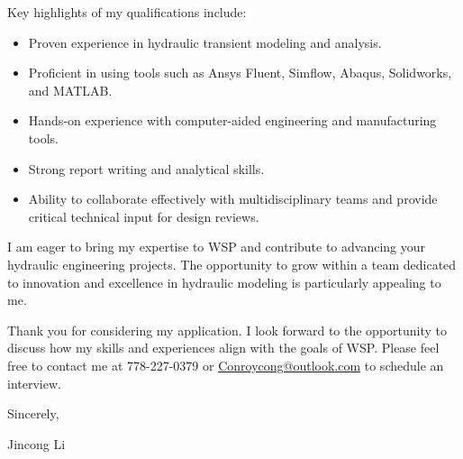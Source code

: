 \documentclass[letterpaper,11pt]{article}
\begin{document}
Key highlights of my qualifications include:

\begin{itemize}
    \item Proven experience in hydraulic transient modeling and analysis.
    \item Proficient in using tools such as Ansys Fluent, Simflow, Abaqus, Solidworks, and MATLAB.
    \item Hands-on experience with computer-aided engineering and manufacturing tools.
    \item Strong report writing and analytical skills.
    \item Ability to collaborate effectively with multidisciplinary teams and provide critical technical input for design reviews.
\end{itemize}

I am eager to bring my expertise to WSP and contribute to advancing your hydraulic engineering projects. The opportunity to grow within a team dedicated to innovation and excellence in hydraulic modeling is particularly appealing to me.

Thank you for considering my application. I look forward to the opportunity to discuss how my skills and experiences align with the goals of WSP. Please feel free to contact me at 778-227-0379 or \href{mailto:Conroycong@outlook.com}{Conroycong@outlook.com} to schedule an interview.

Sincerely,

Jincong Li
\end{document}

